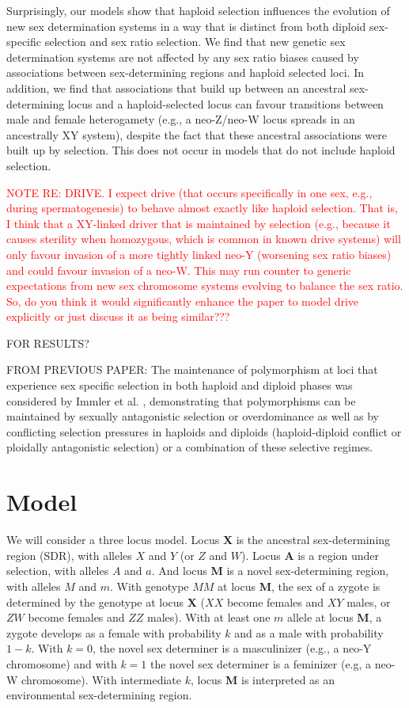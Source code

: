 \documentclass[12pt]{article}
\begin{document}
Surprisingly, our models show that haploid selection influences the evolution of new sex determination systems in a way that is distinct from both diploid sex-specific selection and sex ratio selection. 
We find that new genetic sex determination systems are not affected by any sex ratio biases caused by associations between sex-determining regions and haploid selected loci. 
In addition, we find that associations that build up between an ancestral sex-determining locus and a haploid-selected locus can favour transitions between male and female heterogamety (e.g., a neo-Z/neo-W locus spreads in an ancestrally XY system), despite the fact that these ancestral associations were built up by selection. 
This does not occur in models that do not include haploid selection. 



\textcolor{red}{NOTE RE: DRIVE. I expect drive (that occurs specifically in one sex, e.g., during spermatogenesis) to behave almost exactly like haploid selection. That is, I think that a XY-linked driver that is maintained by selection (e.g., because it causes sterility when homozygous, which is common in known drive systems) will only favour invasion of a more tightly linked neo-Y (worsening sex ratio biases) and could favour invasion of a neo-W. This may run counter to generic expectations from new sex chromosome systems evolving to balance the sex ratio. So, do you think it would significantly enhance the paper to model drive explicitly or just discuss it as being similar???}

{\color{blue} 
FOR RESULTS?

FROM PREVIOUS PAPER:
The maintenance of polymorphism at loci that experience sex specific selection in both haploid and diploid phases was considered by Immler et al. \cite{Immler:2012tl}, demonstrating that polymorphisms can be maintained by sexually antagonistic selection or overdominance as well as by conflicting selection pressures in haploids and diploids (haploid-diploid conflict or ploidally antagonistic selection) or a combination of these selective regimes.  
}


\section*{Model}

We will consider a three locus model.
Locus \textbf{X} is the ancestral sex-determining region (SDR), with alleles $X$ and $Y$ (or $Z$ and $W$).
Locus \textbf{A} is a region under selection, with alleles $A$ and $a$.
And locus \textbf{M} is a novel sex-determining region, with alleles $M$ and $m$.
With genotype $MM$ at locus \textbf{M}, the sex of a zygote is determined by the genotype at locus \textbf{X} ($XX$ become females and $XY$ males, or $ZW$ become females and $ZZ$ males).
With at least one $m$ allele at locus \textbf{M}, a zygote develops as a female with probability $k$ and as a male with probability $1-k$.
With $k=0$, the novel sex determiner is a masculinizer (e.g., a neo-Y chromosome) and with $k=1$ the novel sex determiner is a feminizer (e.g, a neo-W chromosome).
With intermediate $k$, locus \textbf{M} is interpreted as an environmental sex-determining region.
\end{document}
